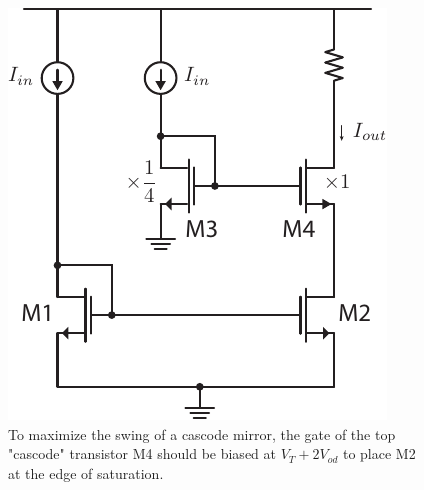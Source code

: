 \begin{figure}[tb]
\centering
\includegraphics[scale=1]{mirror_cascode_hiswing.pdf}
\caption{To maximize the swing of a cascode mirror, the gate of the top "cascode" transistor M4 should be biased at $V_T + 2 V_{od}$ to place M2 at the edge of saturation.}
\label{fig:cascode_hiswing}
\end{figure}
